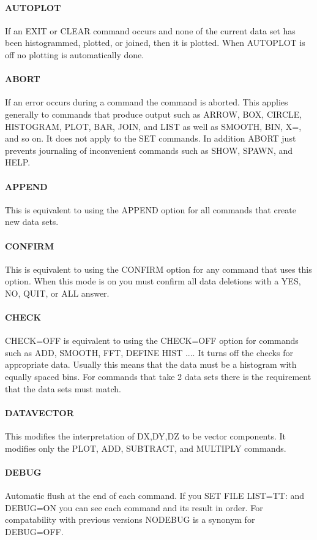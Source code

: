 \paragraph{AUTOPLOT}
If an EXIT or CLEAR command occurs and none of the current data set
has been histogrammed, plotted, or joined, then it is plotted.  When
AUTOPLOT is off no plotting is automatically done.  
\paragraph{ABORT}
If an error occurs during a command the command is aborted.  This
applies generally to commands that produce output such as ARROW, BOX,
CIRCLE, HISTOGRAM, PLOT, BAR, JOIN, and LIST as well as SMOOTH, BIN,
X=, and so on.  It does not apply to the SET commands.  In addition
ABORT just prevents journaling of inconvenient commands such as SHOW,
SPAWN, and HELP.  
\paragraph{APPEND}
This is equivalent to using the APPEND option for all commands that
create new data sets.  
\paragraph{CONFIRM}
This is equivalent to using the CONFIRM option for any command that
uses this option.  When this mode is on you must confirm all data
deletions with a YES, NO, QUIT, or ALL answer.  
\paragraph{CHECK}
CHECK=OFF is equivalent to using the CHECK=OFF option for commands
such as ADD, SMOOTH, FFT, DEFINE HIST ....  It turns off the checks
for appropriate data.  Usually this means that the data must be a
histogram with equally spaced bins.  For commands that take 2 data
sets there is the requirement that the data sets must match.  
\paragraph{DATAVECTOR}
This modifies the interpretation of DX,DY,DZ to be vector components.
It modifies only the PLOT, ADD, SUBTRACT, and MULTIPLY commands.  
\paragraph{DEBUG}
Automatic flush at the end of each command.  If you SET FILE LIST=TT:
and DEBUG=ON you can see each command and its result in order.  For
compatability with previous versions NODEBUG is a synonym for
DEBUG=OFF.  
